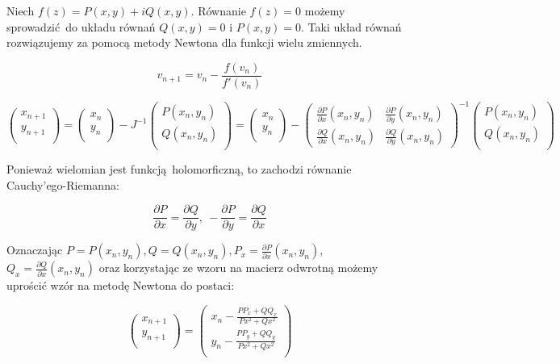 \documentclass{article}
\begin{document}
Niech $f(z) = P(x,y) + iQ(x,y)$. Równanie $f(z) = 0$ możemy sprowadzić do układu równań $Q(x,y) = 0$ i $P(x,y) = 0$. Taki układ równań rozwiązujemy za pomocą metody Newtona dla funkcji wielu zmiennych.

$$v_{n+1} = v_n - \frac{f(v_n)}{f'(v_n)}$$

$$
\begin{pmatrix} x_{n+1}\\ y_{n+1}\\ \end{pmatrix} =  \begin{pmatrix} x_n\\ y_n\\ \end{pmatrix} - J^{-1} \begin{pmatrix} P(x_n, y_n)\\ Q(x_n, y_n)\\ \end{pmatrix} = 
\begin{pmatrix} x_n\\ y_n\\ \end{pmatrix} - \begin{pmatrix}
\frac{\partial P}{\partial x}(x_n, y_n) & \frac{\partial P}{\partial y} (x_n, y_n)\\ 
\frac{\partial Q}{\partial x}(x_n, y_n) & \frac{\partial Q}{\partial y}(x_n, y_n)  
\end{pmatrix}^{-1} \begin{pmatrix} P(x_n, y_n)\\ Q(x_n, y_n)\\ \end{pmatrix} $$


Ponieważ wielomian jest funkcją holomorficzną, to zachodzi równanie Cauchy'ego-Riemanna:

$$\frac{\partial P}{\partial x} = \frac{\partial Q}{\partial y}, \ - \frac{\partial P}{\partial y} =\frac{\partial Q}{\partial x}$$

Oznaczając $P = P(x_n, y_n), Q = Q(x_n, y_n), P_x = \frac{\partial P}{\partial x}(x_n, y_n)$, $Q_x = \frac{\partial Q}{\partial x}(x_n, y_n)$ oraz korzystając ze wzoru na macierz odwrotną możemy uprościć wzór na metodę Newtona do postaci:

$$
\begin{pmatrix} x_{n+1}\\ y_{n+1}\\ \end{pmatrix} = \begin{pmatrix} x_n - \frac{ P P_x + Q Q_x}{Px^2 + Qx^2}\\ y_n - \frac{P P_y + Q Q_y}{Px^2 + Qx^2} \\ \end{pmatrix}
$$
\end{document}
